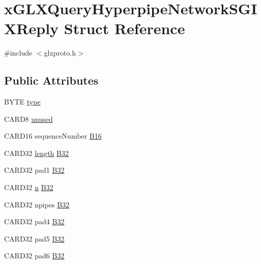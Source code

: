 \hypertarget{structx_g_l_x_query_hyperpipe_network_s_g_i_x_reply}{}\section{x\+G\+L\+X\+Query\+Hyperpipe\+Network\+S\+G\+I\+X\+Reply Struct Reference}
\label{structx_g_l_x_query_hyperpipe_network_s_g_i_x_reply}


{\ttfamily \#include $<$glxproto.\+h$>$}

\subsection*{Public Attributes}
\begin{DoxyCompactItemize}
\item 
B\+Y\+TE \hyperlink{structx_g_l_x_query_hyperpipe_network_s_g_i_x_reply_a2ac5c7b71bbca69b87d91f75416b68b5}{type}
\item 
C\+A\+R\+D8 \hyperlink{structx_g_l_x_query_hyperpipe_network_s_g_i_x_reply_a4c71f30d551c29c89eb8bab442cc1210}{unused}
\item 
C\+A\+R\+D16 sequence\+Number \hyperlink{structx_g_l_x_query_hyperpipe_network_s_g_i_x_reply_a17af668fb0b7aa02277d940f887e6140}{B16}
\item 
C\+A\+R\+D32 \hyperlink{glcorearb_8h_ab9c919755bde3b34349e23a32b4e0fa7}{length} \hyperlink{structx_g_l_x_query_hyperpipe_network_s_g_i_x_reply_a19a84e8d6b9adeb14f0ee05d6e1b10b4}{B32}
\item 
C\+A\+R\+D32 pad1 \hyperlink{structx_g_l_x_query_hyperpipe_network_s_g_i_x_reply_a05f0ada3a405f111e64ce216ae31a587}{B32}
\item 
C\+A\+R\+D32 \hyperlink{glcorearb_8h_ae2b4646468bc89d0ba646f5cf838e051}{n} \hyperlink{structx_g_l_x_query_hyperpipe_network_s_g_i_x_reply_a900d12deb0b31b4c54368a50c59a83eb}{B32}
\item 
C\+A\+R\+D32 npipes \hyperlink{structx_g_l_x_query_hyperpipe_network_s_g_i_x_reply_a969b2ed8c0ae562ed49cf229eb40bdd7}{B32}
\item 
C\+A\+R\+D32 pad4 \hyperlink{structx_g_l_x_query_hyperpipe_network_s_g_i_x_reply_a200fe6adb72b81b52198a4917a4341bd}{B32}
\item 
C\+A\+R\+D32 pad5 \hyperlink{structx_g_l_x_query_hyperpipe_network_s_g_i_x_reply_a1e4400cef6ff96aaff2046c69dc35c55}{B32}
\item 
C\+A\+R\+D32 pad6 \hyperlink{structx_g_l_x_query_hyperpipe_network_s_g_i_x_reply_a2919d5d9134e6c0a9e3e751d7b8476ee}{B32}
\end{DoxyCompactItemize}


